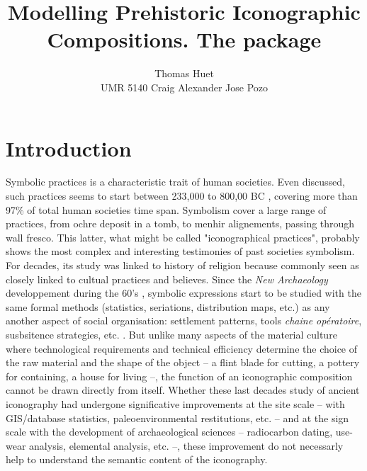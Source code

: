\documentclass[article]{jss}\usepackage{knitr}
\author{Thomas Huet\\UMR 5140 \And Craig Alexander \And Jose Pozo}
\title{Modelling Prehistoric Iconographic Compositions. The \proglang{R} package \pkg{decorr}}
\begin{document}

\section[Introduction]{Introduction} \label{sec:intro}

Symbolic practices is a characteristic trait of human societies. Even discussed, such practices seems to start between 233,000 to 800,00 BC \citep{dErrico00}, covering more than 97\% of total human societies time span. Symbolism cover a large range of practices, from ochre deposit in a tomb, to menhir alignements, passing through wall fresco. This latter, what might be called "iconographical practices", probably shows the most complex and interesting testimonies of past societies symbolism. For decades, its study was linked to history of religion because commonly seen as closely linked to cultual practices and believes. Since the \textit{New Archaeology} developpement during the 60's \citep{Clarke14}, symbolic expressions start to be studied with the same formal methods (statistics, seriations, distribution maps, etc.) as any another aspect of social organisation: settlement patterns, tools \emph{chaine op\'eratoire}, susbsitence strategies, etc. \citep{Renfrew91}. But unlike many aspects of the material culture where technological requirements and technical efficiency determine the choice of the raw material and the shape of the object -- a flint blade for cutting, a pottery for containing, a house for living --, the function of an iconographic composition cannot be drawn directly from itself. Whether these last decades study of ancient iconography had  undergone significative improvements at the site scale -- with GIS/database statistics, paleoenvironmental restitutions, etc. -- and at the sign scale with the development of archaeological sciences -- radiocarbon dating, use-wear analysis, elemental analysis, etc. --, these improvement do not necessarly help to understand the semantic content of the iconography.
\end{document}
